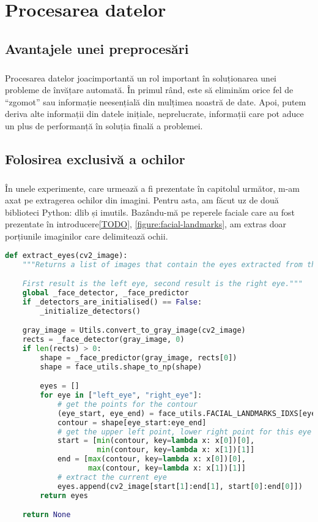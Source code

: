 \chapter{Procesarea datelor}
\section{Avantajele unei preprocesări}
\paragraph{}
Procesarea datelor joacimportantă un rol important în soluționarea unei probleme de învățare automată.
În primul rând, este  să eliminăm orice fel de ``zgomot'' sau informație neesențială din mulțimea noastră de date.
Apoi, putem deriva alte informații din datele inițiale, neprelucrate, informații care pot aduce un plus de performanță în soluția finală a problemei.

\section{Folosirea exclusivă a ochilor}
\label{data-processing:eyes}
\paragraph{}
În unele experimente, care urmează a fi prezentate în capitolul următor, m-am axat pe extragerea ochilor din imagini.
Pentru asta, am făcut uz de două biblioteci Python: dlib și imutils.
Bazându-mă pe reperele faciale care au fost prezentate în introducere\ref{TODO}, \ref{figure:facial-landmarks}, am extras doar porțiunile imaginilor care delimitează ochii.

\begin{lstlisting}[language=Python, caption=Extragerea ochilor dintr-o imagine]
def extract_eyes(cv2_image):
    """Returns a list of images that contain the eyes extracted from the original image.

    First result is the left eye, second result is the right eye."""
    global _face_detector, _face_predictor
    if _detectors_are_initialised() == False:
        _initialize_detectors()

    gray_image = Utils.convert_to_gray_image(cv2_image)
    rects = _face_detector(gray_image, 0)
    if len(rects) > 0:
        shape = _face_predictor(gray_image, rects[0])
        shape = face_utils.shape_to_np(shape)

        eyes = []
        for eye in ["left_eye", "right_eye"]:
            # get the points for the contour
            (eye_start, eye_end) = face_utils.FACIAL_LANDMARKS_IDXS[eye]
            contour = shape[eye_start:eye_end]
            # get the upper left point, lower right point for this eye
            start = [min(contour, key=lambda x: x[0])[0],
                     min(contour, key=lambda x: x[1])[1]]
            end = [max(contour, key=lambda x: x[0])[0],
                   max(contour, key=lambda x: x[1])[1]]
            # extract the current eye
            eyes.append(cv2_image[start[1]:end[1], start[0]:end[0]])
        return eyes

    return None
\end{lstlisting}

